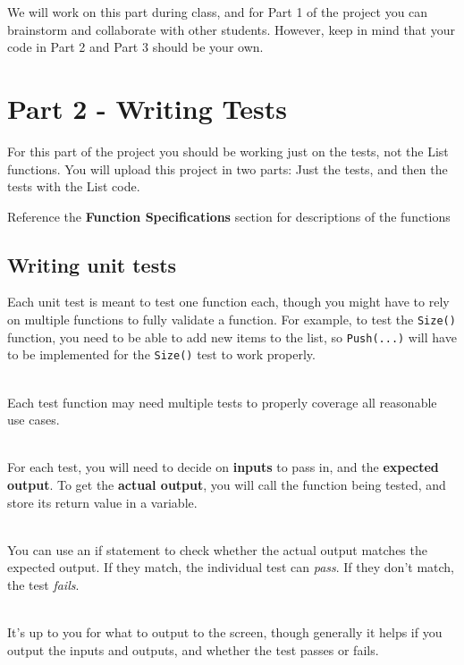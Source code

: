     We will work on this part during class, and for Part 1 of the project
    you can brainstorm and collaborate with other students. However,
    keep in mind that your code in Part 2 and Part 3 should be your own.

    \newpage
    
    \section{Part 2 - Writing Tests}

    \color{red} For this part of the project you should be working just on the tests,
    not the List functions. \color{black}
    You will upload this project in two parts: Just the tests, and then the
    tests with the List code.

    Reference the \textbf{Function Specifications} section for descriptions of the functions

    \subsection{Writing unit tests}

    Each unit test is meant to test one function each, though you might have to rely on
    multiple functions to fully validate a function. For example, to test the \texttt{Size()}
    function, you need to be able to add new items to the list, so \texttt{Push(...)} will have
    to be implemented for the \texttt{Size()} test to work properly.

    ~\\ Each test function may need multiple tests to properly coverage all reasonable
    use cases.

    ~\\ For each test, you will need to decide on \textbf{inputs} to pass in,
    and the \textbf{expected output}. To get the \textbf{actual output}, you will
    call the function being tested, and store its return value in a variable.

    ~\\ You can use an if statement to check whether the actual output matches
    the expected output. If they match, the individual test can \textit{pass}.
    If they don't match, the test \textit{fails}.

    ~\\ It's up to you for what to output to the screen, though generally it helps
    if you output the inputs and outputs, and whether the test passes or fails.

